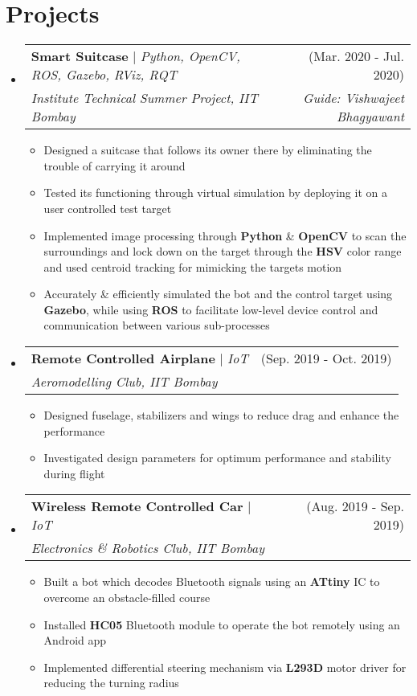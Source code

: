 \documentclass[a4paper,11pt]{article}
\makeatletter
\newcommand{\resumeItem}[1]{
  \item\small{
    {#1 \vspace{-2pt}}
  }
}
\newcommand{\resumeProjectHeading}[4]{
    \item
    \begin{tabular*}{\textwidth}{l@{\extracolsep{\fill}}r}
      \small#1 & #2 \\
      \textit{\small#3} & \textit{\small #4}\\
    \end{tabular*}\vspace{-7pt}
}
\newcommand{\resumeSubHeadingListStart}{\begin{itemize}[leftmargin=-0pt, label={}]}
\newcommand{\resumeSubHeadingListEnd}{\end{itemize}}
\newcommand{\resumeItemListStart}{\begin{itemize}}
\newcommand{\resumeItemListEnd}{\end{itemize}\vspace{-5pt}}
\makeatother
\begin{document}
  \section{Projects}
      \resumeSubHeadingListStart
        \resumeProjectHeading
            {\textbf{Smart Suitcase} $|$ \emph{Python, OpenCV, ROS, Gazebo, RViz, RQT}}{(Mar. 2020 - Jul. 2020)}{Institute Technical Summer Project, IIT Bombay}{Guide: Vishwajeet Bhagyawant}
            \resumeItemListStart
              \resumeItem{Designed a suitcase that follows its owner there by eliminating the trouble of carrying it around} 
              \resumeItem{Tested its functioning through virtual simulation by deploying it on a user controlled test target}
              \resumeItem{Implemented image processing through \textbf{Python} \& \textbf{OpenCV} to scan the surroundings and lock down on the target through the \textbf{HSV} color range and used centroid tracking for mimicking the targets motion}
              \resumeItem{Accurately \& efficiently simulated the bot and the control target using \textbf{Gazebo}, while using \textbf{ROS} to facilitate low-level device control and communication between various sub-processes}
            \resumeItemListEnd
        \resumeProjectHeading
            {\textbf{Remote Controlled Airplane} $|$ \emph{IoT}}{(Sep. 2019 - Oct. 2019)} {Aeromodelling Club, IIT Bombay}{}
            \resumeItemListStart
              \resumeItem{Designed fuselage, stabilizers and wings to reduce drag and enhance the performance} 
              \resumeItem{Investigated design parameters for optimum performance and stability during flight}
            \resumeItemListEnd
        \resumeProjectHeading
            {\textbf{Wireless Remote Controlled Car} $|$ \emph{IoT}}{(Aug. 2019 - Sep. 2019)} {Electronics \& Robotics Club, IIT Bombay}{}
            \resumeItemListStart
              \resumeItem{Built a bot which decodes Bluetooth signals using an \textbf{ATtiny} IC to overcome an obstacle-filled course} 
              \resumeItem{Installed \textbf{HC05} Bluetooth module to operate the bot remotely using an Android app}
              \resumeItem{Implemented differential steering mechanism via \textbf{L293D} motor driver for reducing the turning radius}
            \resumeItemListEnd

      \resumeSubHeadingListEnd

\end{document}
